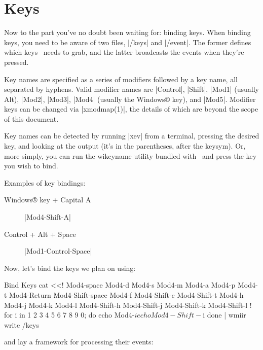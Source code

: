 \section{Keys}

\label{sec:keybindings}
Now to the part you've no doubt been waiting for: binding keys.
When binding keys, you need to be aware of two files, |/keys|
and |/event|. The former defines which keys \wmii\ needs to
grab, and the latter broadcasts the events when they're pressed.

Key names are specified as a series of modifiers followed by a
key name, all separated by hyphens. Valid modifier names are
|Control|, |Shift|, |Mod1| (usually Alt), |Mod2|, |Mod3|, |Mod4|
(usually the Windows® key), and |Mod5|. Modifier keys can be
changed via |xmodmap(1)|, the details of which are beyond the
scope of this document.

Key names can be detected by running |xev| from a
terminal, pressing the desired key, and looking at the output
(it's in the parentheses, after the keysym). Or, more simply,
you can run the  {wikeyname} utility bundled with \wmii\
and press the key you wish to bind.

Examples of key bindings:

\begin{description}
  \item[Windows® key + Capital A] |Mod4-Shift-A|
  \item[Control + Alt + Space]    |Mod1-Control-Space|
\end{description}

Now, let's bind the keys we plan on using:

\begin{Fragment}{Bind Keys}
  {
  cat <<!
  Mod4-space
  Mod4-d
  Mod4-s
  Mod4-m
  Mod4-a
  Mod4-p
  Mod4-t
  Mod4-Return
  Mod4-Shift-space
  Mod4-f
  Mod4-Shift-c
  Mod4-Shift-t
  Mod4-h
  Mod4-j
  Mod4-k
  Mod4-l
  Mod4-Shift-h
  Mod4-Shift-j
  Mod4-Shift-k
  Mod4-Shift-l
  !
  for i in 1 2 3 4 5 6 7 8 9 0; do
      echo Mod4-$i
      echo Mod4-Shift-$i
  done
  } | wmiir write /keys
\end{Fragment}

and lay a framework for processing their events:


